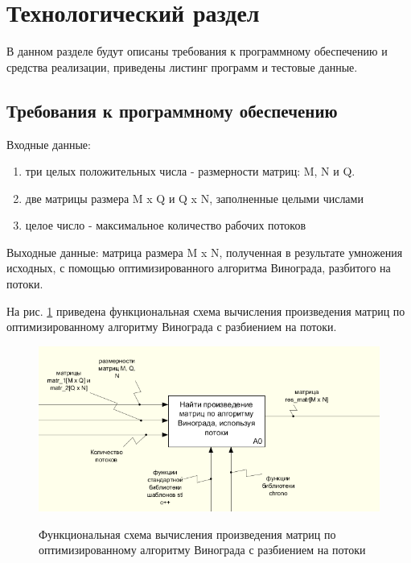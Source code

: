 \documentclass[a4paper,12pt]{article}
\begin{document}
  
\pagebreak
\newpage         

\section{Технологический раздел}

	В данном разделе будут описаны требования к программному обеспечению и средства реализации, приведены листинг программ и тестовые данные.
	\subsection{Требования к программному обеспечению}
	Входные данные: 
	 \begin{enumerate} 
	 \item[1)] три целых положительных числа - размерности матриц: M, N и Q.
	 \item[2)] две матрицы размера M x Q и Q x N, заполненные целыми числами
	 \item[3)] целое число - максимальное количество рабочих потоков 
	 \end{enumerate}
	
	Выходные данные: матрица размера M x N, полученная в результате умножения исходных, с помощью оптимизированного алгоритма Винограда, разбитого на потоки.
	
	На рис. \ref{fig:idef0} приведена функциональная схема вычисления произведения матриц по оптимизированному алгоритму Винограда с разбиением на потоки.
        
        \begin{figure}[h!]
        	\begin{center}
        		{\includegraphics[width = \textwidth]{idef0.png}}
        		\caption{Функциональная схема вычисления произведения матриц по оптимизированному алгоритму Винограда с разбиением на потоки}
        		\label{fig:idef0}
        	\end{center}
        \end{figure}
        
\end{document}
